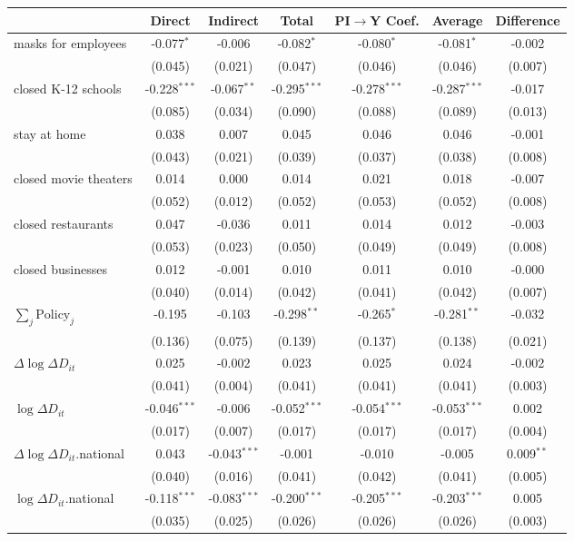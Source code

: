 
\begin{tabular}{lccccc|>{}c}
\toprule
  & Direct & Indirect & Total & PI$\to$Y Coef. & Average & Difference\\
\midrule
masks for employees & -0.077$^{*}$ & -0.006 & -0.082$^{*}$ & -0.080$^{*}$ & -0.081$^{*}$ & -0.002\\
 & (0.045) & (0.021) & (0.047) & (0.046) & (0.046) & (0.007)\\
closed K-12 schools & -0.228$^{***}$ & -0.067$^{**}$ & -0.295$^{***}$ & -0.278$^{***}$ & -0.287$^{***}$ & -0.017\\
 & (0.085) & (0.034) & (0.090) & (0.088) & (0.089) & (0.013)\\
stay at home & 0.038 & 0.007 & 0.045 & 0.046 & 0.046 & -0.001\\
 & (0.043) & (0.021) & (0.039) & (0.037) & (0.038) & (0.008)\\
closed movie theaters & 0.014 & 0.000 & 0.014 & 0.021 & 0.018 & -0.007\\
 & (0.052) & (0.012) & (0.052) & (0.053) & (0.052) & (0.008)\\
closed restaurants & 0.047 & -0.036 & 0.011 & 0.014 & 0.012 & -0.003\\
 & (0.053) & (0.023) & (0.050) & (0.049) & (0.049) & (0.008)\\
closed businesses & 0.012 & -0.001 & 0.010 & 0.011 & 0.010 & -0.000\\
 & (0.040) & (0.014) & (0.042) & (0.041) & (0.042) & (0.007)\\
$\sum_j \mathrm{Policy}_j$ & -0.195 & -0.103 & -0.298$^{**}$ & -0.265$^{*}$ & -0.281$^{**}$ & -0.032\\
 & (0.136) & (0.075) & (0.139) & (0.137) & (0.138) & (0.021)\\
$\Delta \log \Delta D_{it}$ & 0.025 & -0.002 & 0.023 & 0.025 & 0.024 & -0.002\\
 & (0.041) & (0.004) & (0.041) & (0.041) & (0.041) & (0.003)\\
$\log \Delta D_{it}$ & -0.046$^{***}$ & -0.006 & -0.052$^{***}$ & -0.054$^{***}$ & -0.053$^{***}$ & 0.002\\
 & (0.017) & (0.007) & (0.017) & (0.017) & (0.017) & (0.004)\\
$\Delta \log \Delta D_{it}$.national & 0.043 & -0.043$^{***}$ & -0.001 & -0.010 & -0.005 & 0.009$^{**}$\\
 & (0.040) & (0.016) & (0.041) & (0.042) & (0.041) & (0.005)\\
$\log \Delta D_{it}$.national & -0.118$^{***}$ & -0.083$^{***}$ & -0.200$^{***}$ & -0.205$^{***}$ & -0.203$^{***}$ & 0.005\\
 & (0.035) & (0.025) & (0.026) & (0.026) & (0.026) & (0.003)\\
\bottomrule
\end{tabular}